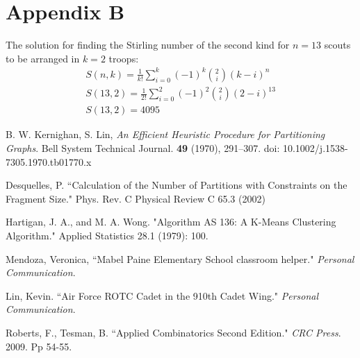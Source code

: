 \documentclass{amsart}
\theoremstyle{definition}
\theoremstyle{remark}
\numberwithin{equation}{section}
\begin{document}
\section*{Appendix B}
The solution for finding the Stirling number of the second kind for $n = 13$ scouts to be arranged in $k = 2$ troops:
\begin{gather*}
	S(n,k) = \frac{1}{k!} \sum_{i=0}^{k}(-1)^k {2 \choose i} (k - i)^{n} \\
	S(13,2) = \frac{1}{2!} \sum_{i=0}^{2}(-1)^2 {2 \choose i} (2 - i)^{13} \\
	S(13, 2) = 4095
\end{gather*}


\begin{thebibliography}{10}

 B. W. Kernighan, S. Lin, \textit{An Efficient Heuristic Procedure for Partitioning Graphs}. Bell System Technical Journal. \textbf{49} (1970), 291--307. doi: 10.1002/j.1538-7305.1970.tb01770.x

 Desquelles, P. ``Calculation of the Number of Partitions with Constraints on the Fragment Size." Phys. Rev. C Physical Review C 65.3 (2002)

 Hartigan, J. A., and M. A. Wong. "Algorithm AS 136: A K-Means Clustering Algorithm." Applied Statistics 28.1 (1979): 100.

 Mendoza, Veronica, ``Mabel Paine Elementary School classroom helper." \textit{Personal Communication}.

 Lin, Kevin. ``Air Force ROTC Cadet in the 910th Cadet Wing." \textit{Personal Communication}.

 Roberts, F., Tesman, B. ``Applied Combinatorics Second Edition." \textit{CRC Press}. 2009. Pp 54-55.

\end{thebibliography}
\end{document}
